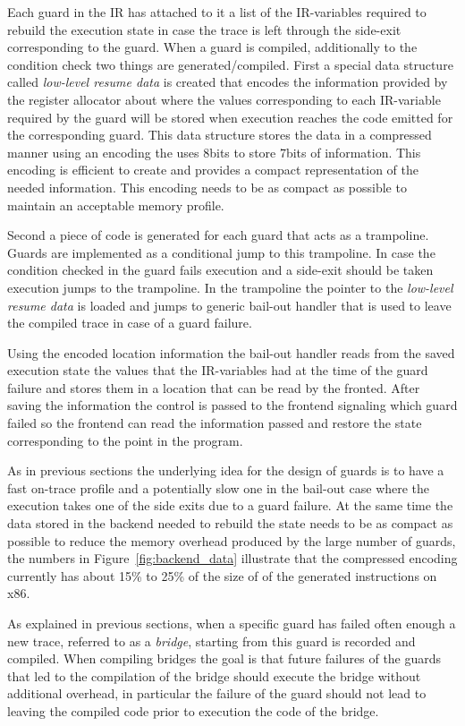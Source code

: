 \documentclass[10pt,preprint]{sigplanconf}
\begin{document}
Each guard in the IR has attached to it a list of the IR-variables required to
rebuild the execution state in case the trace is left through the side-exit
corresponding to the guard. When a guard is compiled, additionally to the
condition check two things are generated/compiled. First a special data
structure called \emph{low-level resume data} is created that encodes the
information provided by the register allocator about where the values
corresponding to each IR-variable required by the guard will be stored when
execution reaches the code emitted for the corresponding guard. This data
structure stores the data in a compressed manner using an encoding the uses
8bits to store 7bits of information. This encoding is efficient to create and
provides a compact representation of the needed information. This encoding
needs to be as compact as possible to maintain an acceptable memory profile.

Second a piece of code is generated for each guard that acts as a trampoline.
Guards are implemented as a conditional jump to this trampoline. In case the
condition checked in the guard fails execution and a side-exit should be taken
execution jumps to the trampoline. In the trampoline the pointer to the
\emph{low-level resume data} is loaded and jumps to generic bail-out handler
that is used to leave the compiled trace in case of a guard failure.

Using the encoded location information the bail-out handler reads from the
saved execution state the values that the IR-variables had  at the time of the
guard failure and stores them in a location that can be read by the fronted.
After saving the information the control is passed to the frontend signaling
which guard failed so the frontend can read the information passed and restore
the state corresponding to the point in the program.

As in previous sections the underlying idea for the design of guards is to have
a fast on-trace profile and a potentially slow one in the bail-out case where
the execution takes one of the side exits due to a guard failure. At the same
time the data stored in the backend needed to rebuild the state needs to be as
compact as possible to reduce the memory overhead produced by the large number
of guards, the numbers in Figure~\ref{fig:backend_data} illustrate that the
compressed encoding currently has about 15\% to 25\% of the size of of the
generated instructions on x86.

As explained in previous sections, when a specific guard has failed often enough
a new trace, referred to as a \emph{bridge}, starting from this guard is recorded and
compiled. When compiling bridges the goal is that future failures of the guards
that led to the compilation of the bridge should execute the bridge without
additional overhead, in particular the failure of the guard should not lead
to leaving the compiled code prior to execution the code of the bridge.
\end{document}
